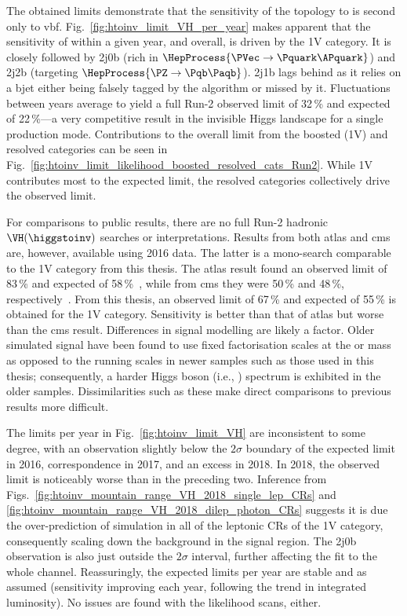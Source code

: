 The obtained limits demonstrate that the sensitivity of the \VH topology to \higgstoinv is second only to \acrshort{vbf}. Fig.~\ref{fig:htoinv_limit_VH_per_year} makes apparent that the sensitivity of \VH within a given year, and overall, is driven by the 1V category. It is closely followed by 2j0b (rich in $\HepProcess{\PVec \to \Pquark\APquark}$) and 2j2b (targeting $\HepProcess{\PZ \to \Pqb\Paqb}$). 2j1b lags behind as it relies on a \gls{bjet} either being falsely tagged by the \deepcsv algorithm or missed by it. Fluctuations between years average to yield a full Run-2 observed limit of 32\,\% and expected of 22\,\%---a very competitive result in the invisible Higgs landscape for a single production mode. Contributions to the overall limit from the boosted (1V) and resolved categories can be seen in Fig.~\ref{fig:htoinv_limit_likelihood_boosted_resolved_cats_Run2}. While 1V contributes most to the expected limit, the resolved categories collectively drive the observed limit.

For comparisons to public results, there are no full Run-2 hadronic $\VH(\higgstoinv)$ searches or interpretations. Results from both \acrshort{atlas} and \acrshort{cms} are, however, available using 2016 data. The latter is a mono-\PVec search comparable to the 1V category from this thesis. The \acrshort{atlas} \VH result found an observed limit of 83\,\% and expected of 58\,\%~\cite{Aaboud:2018xdl}, while from \acrshort{cms} they were 50\,\% and 48\,\%, respectively~\cite{Sirunyan:2017jix}. From this thesis, an observed limit of 67\,\% and expected of 55\,\% is obtained for the 1V category. Sensitivity is better than that of \acrshort{atlas} but worse than the \acrshort{cms} result. Differences in signal modelling are likely a factor. Older simulated signal have been found to use fixed factorisation scales at the \PW or \PH mass as opposed to the running scales in newer samples such as those used in this thesis; consequently, a harder Higgs boson \pt (i.e., \ptmiss) spectrum is exhibited in the older samples. Dissimilarities such as these make direct comparisons to previous results more difficult.


The limits per year in Fig.~\ref{fig:htoinv_limit_VH} are inconsistent to some degree, with an observation slightly below the $\text{2}\sigma$ boundary of the expected limit in 2016, correspondence in 2017, and an excess in 2018. In 2018, the observed limit is noticeably worse than in the preceding two. Inference from Figs.~\ref{fig:htoinv_mountain_range_VH_2018_single_lep_CRs} and \ref{fig:htoinv_mountain_range_VH_2018_dilep_photon_CRs} suggests it is due the over-prediction of simulation in all of the leptonic \glspl{CR} of the 1V category, consequently scaling down the background in the signal region. The 2j0b observation is also just outside the $\text{2}\sigma$ interval, further affecting the fit to the whole channel. Reassuringly, the expected limits per year are stable and as assumed (sensitivity improving each year, following the trend in integrated luminosity). No issues are found with the likelihood scans, either.


